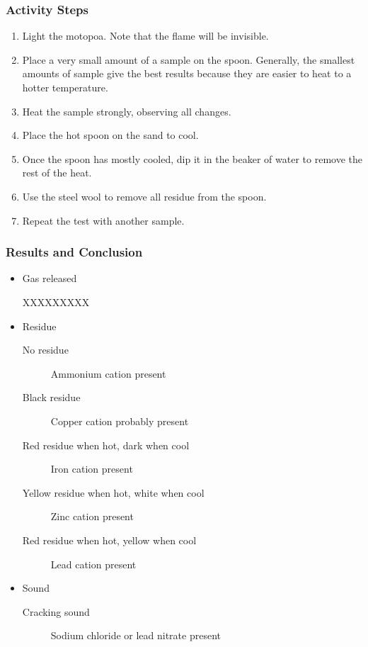 \subsubsection{Activity Steps}
\begin{enumerate}
\item{Light the motopoa. Note that the flame will be invisible.}
\item{Place a very small amount of a sample on the spoon. Generally, the smallest amounts of sample give the best results because they are easier to heat to a hotter temperature.}
\item{Heat the sample strongly, observing all changes.}
\item{Place the hot spoon on the sand to cool.}
\item{Once the spoon has mostly cooled, dip it in the beaker of water to remove the rest of the heat.}
\item{Use the steel wool to remove all residue from the spoon.}
\item{Repeat the test with another sample.}
\end{enumerate}

\subsubsection{Results and Conclusion}
\begin{itemize}
\item{Gas released}
\begin{description}
XXXXXXXXX
\end{description}
\item{Residue}
\begin{description}
\item[No residue]{Ammonium cation present}
\item[Black residue]{Copper cation probably present}
\item[Red residue when hot, dark when cool]{Iron cation present}
\item[Yellow residue when hot, white when cool]{Zinc cation present}
\item[Red residue when hot, yellow when cool]{Lead cation present}
\end{description}
\item{Sound}
\begin{description}
\item[Cracking sound]{Sodium chloride or lead nitrate present}
\end{description}
\end{itemize}

